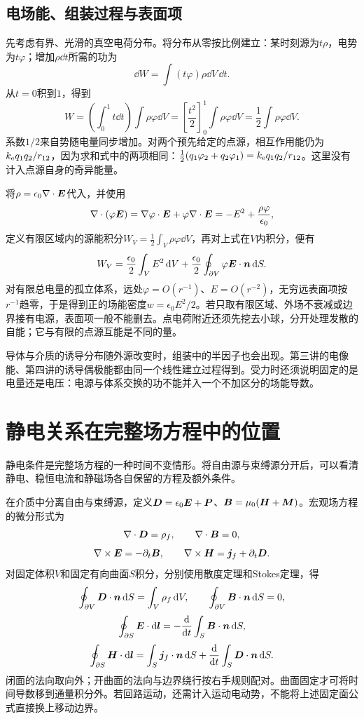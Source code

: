 \subsection{电场能、组装过程与表面项}\label{sec:es-field-energy}
先考虑有界、光滑的真空电荷分布。将分布从零按比例建立：某时刻源为$t\rho$，电势为$t\varphi$；增加$\rho\dd t$所需的功为
\[\dd W=\int(t\varphi)\rho\dd V\,\dd t.
\]
从$t=0$积到$1$，得到
\[W=\left(\int_0^1t\dd t\right)\int\rho\varphi\dd V
=\left[\frac{t^2}2\right]_0^1\int\rho\varphi\dd V
=\frac12\int\rho\varphi\dd V.
\]
系数$1/2$来自势随电量同步增加。对两个预先给定的点源，相互作用能仍为$k_{\rm e} q_1q_2/r_{12}$，因为求和式中的两项相同：$\tfrac12(q_1\varphi_2+q_2\varphi_1)=k_{\rm e} q_1q_2/r_{12}$。这里没有计入点源自身的奇异能量。

将$\rho=\epsilon_0\nabla\cdot\bm{E}$代入，并使用
\[\nabla\cdot(\varphi\bm{E})
=\nabla\varphi\cdot\bm{E}+\varphi\nabla\cdot\bm{E}
=-E^2+\frac{\rho\varphi}{\epsilon_0},
\]
定义有限区域内的源能积分$W_V=\tfrac12\int_V\rho\varphi\dd V$，再对上式在$V$内积分，便有
\[W_V=\frac{\epsilon_0}{2}\int_VE^2\mathop{}\!\mathrm d V
+\frac{\epsilon_0}{2}\oint_{\partial V}\varphi\bm{E}\cdot\bm{n}\mathop{}\!\mathrm d S.
\]
对有限总电量的孤立体系，远处$\varphi=O(r^{-1})$、$E=O(r^{-2})$，无穷远表面项按$r^{-1}$趋零，于是得到正的场能密度$w=\epsilon_0E^2/2$。若只取有限区域、外场不衰减或边界接有电源，表面项一般不能删去。点电荷附近还须先挖去小球，分开处理发散的自能；它与有限的点源互能是不同的量。

导体与介质的诱导分布随外源改变时，组装中的半因子也会出现。第三讲的电像能、第四讲的诱导偶极能都由同一个线性建立过程得到。受力时还须说明固定的是电量还是电压：电源与体系交换的功不能并入一个不加区分的场能导数。



\section{静电关系在完整场方程中的位置}\label{sec:es1-maxwell}
静电条件是完整场方程的一种时间不变情形。将自由源与束缚源分开后，可以看清静电、稳恒电流和静磁场各自保留的方程及额外条件。

在介质中分离自由与束缚源，定义$\bm{D}=\epsilon_0\bm{E}+\bm{P}$、$\bm{B}=\mu_0(\bm{H}+\bm{M})$。宏观场方程的微分形式为
\[\nabla\cdot\bm{D}=\rho_f,\qquad \nabla\cdot\bm{B}=0,\]
\[\nabla\times\bm{E}=-\partial_t\bm{B},\qquad
\nabla\times\bm{H}=\bm{j}_f+\partial_t\bm{D}.\]
对固定体积$V$和固定有向曲面$S$积分，分别使用散度定理和Stokes定理，得
\[\oint_{\partial V}\bm{D}\cdot\bm{n}\mathop{}\!\mathrm d S=\int_V\rho_f\mathop{}\!\mathrm d V,
\qquad \oint_{\partial V}\bm{B}\cdot\bm{n}\mathop{}\!\mathrm d S=0,\]
\[\oint_{\partial S}\bm{E}\cdot\mathop{}\!\mathrm d\bm{l}
=-\frac{\mathop{}\!\mathrm d}{\mathop{}\!\mathrm d t}\int_S\bm{B}\cdot\bm{n}\mathop{}\!\mathrm d S,\]
\[\oint_{\partial S}\bm{H}\cdot\mathop{}\!\mathrm d\bm{l}
=\int_S\bm{j}_f\cdot\bm{n}\mathop{}\!\mathrm d S
+\frac{\mathop{}\!\mathrm d}{\mathop{}\!\mathrm d t}\int_S\bm{D}\cdot\bm{n}\mathop{}\!\mathrm d S.\]
闭面的法向取向外；开曲面的法向与边界绕行按右手规则配对。曲面固定才可将时间导数移到通量积分外。若回路运动，还需计入运动电动势，不能将上述固定面公式直接换上移动边界。

